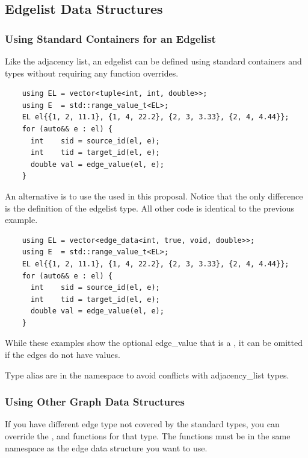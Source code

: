 \subsection{Edgelist Data Structures}
\subsubsection{Using Standard Containers for an Edgelist}
Like the adjacency list, an edgelist can be defined using standard containers and types without 
requiring any function overrides.

\begin{lstlisting}
    using EL = vector<tuple<int, int, double>>;
    using E  = std::range_value_t<EL>;
    EL el{{1, 2, 11.1}, {1, 4, 22.2}, {2, 3, 3.33}, {2, 4, 4.44}};
    for (auto&& e : el) {
      int    sid = source_id(el, e);
      int    tid = target_id(el, e);
      double val = edge_value(el, e);
    }
\end{lstlisting}

An alternative is to use the  used in this proposal. Notice that the only difference
is the definition of the edgelist type. All other code is identical to the previous example.
\begin{lstlisting}
    using EL = vector<edge_data<int, true, void, double>>;
    using E  = std::range_value_t<EL>;
    EL el{{1, 2, 11.1}, {1, 4, 22.2}, {2, 3, 3.33}, {2, 4, 4.44}};
    for (auto&& e : el) {
      int    sid = source_id(el, e);
      int    tid = target_id(el, e);
      double val = edge_value(el, e);
    }
\end{lstlisting}

While these examples show the optional edge\_value that is a , it can be omitted if the edges 
do not have values.

Type alias are in the namespace  to avoid conflicts with adjacency\_list
types.

\subsubsection{Using Other Graph Data Structures}
If you have different edge type not covered by the standard types, you can override the
,  and  functions for that type.
The functions must be in the same namespace as the edge data structure you want to use.
